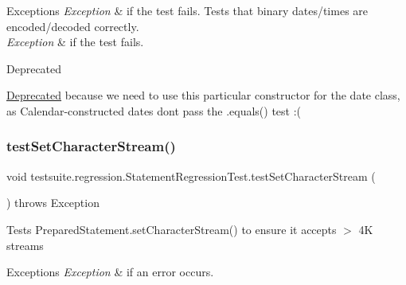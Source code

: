 \begin{DoxyExceptions}{Exceptions}
{\em Exception} & if the test fails. Tests that binary dates/times are encoded/decoded correctly.\\
\hline
{\em Exception} & if the test fails.\\
\hline
\end{DoxyExceptions}
\begin{DoxyRefDesc}{Deprecated}
\item[\mbox{\hyperlink{deprecated__deprecated000008}{Deprecated}}]because we need to use this particular constructor for the date class, as Calendar-\/constructed dates don\textquotesingle{}t pass the .equals() test \+:( \end{DoxyRefDesc}
\mbox{\label{classtestsuite_1_1regression_1_1_statement_regression_test_a8043401e658d50f132bd6407926ed1f6}} 
\subsubsection{\texorpdfstring{test\+Set\+Character\+Stream()}{testSetCharacterStream()}}
{\footnotesize\ttfamily void testsuite.\+regression.\+Statement\+Regression\+Test.\+test\+Set\+Character\+Stream (\begin{DoxyParamCaption}{ }\end{DoxyParamCaption}) throws Exception}

Tests Prepared\+Statement.\+set\+Character\+Stream() to ensure it accepts $>$ 4K streams


\begin{DoxyExceptions}{Exceptions}
{\em Exception} & if an error occurs. \\
\hline
\end{DoxyExceptions}
\mbox{\label{classtestsuite_1_1regression_1_1_statement_regression_test_a94ba62e42c45e2025b030f3a7f69ea17}} 
